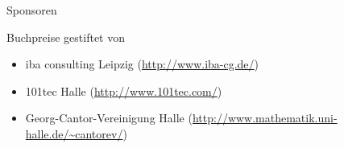 \begin{slide}{Sponsoren}

Buchpreise gestiftet von
\begin{itemize}
\item
iba consulting Leipzig (\url{http://www.iba-cg.de/})
\item
101tec Halle (\url{http://www.101tec.com/})
\item
Georg-Cantor-Vereinigung Halle
(\url{http://www.mathematik.uni-halle.de/~cantorev/})
\end{itemize}

\end{slide}
